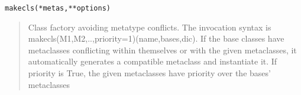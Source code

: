 \documentclass[10pt,english]{article}
\begin{document}
\texttt{makecls(*metas,**options)}
\begin{quote}

Class factory avoiding metatype conflicts. The invocation syntax is
makecls(M1,M2,..,priority=1)(name,bases,dic). If the base classes have 
metaclasses conflicting within themselves or with the given metaclasses,
it automatically generates a compatible metaclass and instantiate it. 
If priority is True, the given metaclasses have priority over the 
bases' metaclasses
\end{quote}
\end{document}
